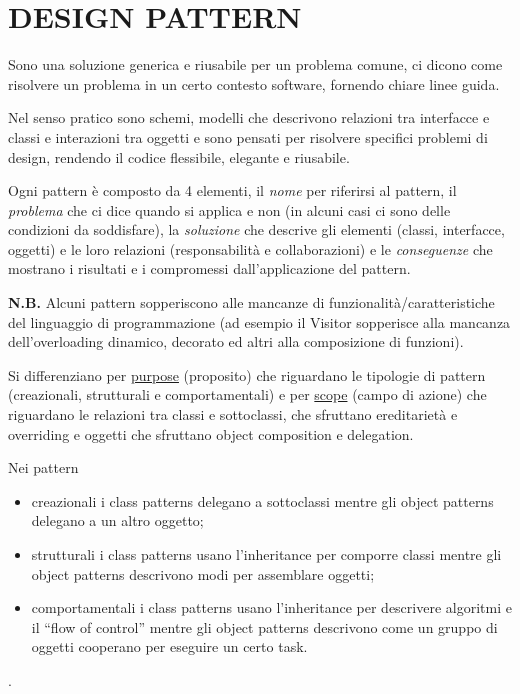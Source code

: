 \chapter{DESIGN PATTERN}

Sono una soluzione generica e riusabile per un problema comune, ci dicono come risolvere un problema in un certo contesto software, fornendo chiare linee guida.

Nel senso pratico sono schemi, modelli che descrivono relazioni tra interfacce e classi e interazioni tra oggetti e sono pensati per risolvere specifici problemi di design, 
rendendo il codice flessibile, elegante e riusabile. 

Ogni pattern è composto da 4 elementi, il \textit{nome} per riferirsi al pattern, il \textit{problema} che ci dice quando si applica e non 
(in alcuni casi ci sono delle condizioni da soddisfare), la \textit{soluzione} che descrive gli elementi (classi, interfacce, oggetti) e le loro relazioni 
(responsabilità e collaborazioni) e le \textit{conseguenze} che mostrano i risultati e i compromessi dall’applicazione del pattern.
\medskip

\textbf{N.B.} Alcuni pattern sopperiscono alle mancanze di funzionalità/caratteristiche del linguaggio di programmazione 
(ad esempio il Visitor sopperisce alla mancanza dell'overloading dinamico, decorato ed altri alla composizione di funzioni).
\medskip

Si differenziano per \underline{purpose} (proposito) che riguardano le tipologie di pattern (creazionali, strutturali e comportamentali) e per \underline{scope} 
(campo di azione) che riguardano le relazioni tra classi e sottoclassi, che sfruttano ereditarietà e overriding e oggetti che sfruttano object composition e delegation.
\smallskip

Nei pattern
\begin{itemize}
    \item creazionali i class patterns delegano a sottoclassi mentre gli object patterns delegano a un altro oggetto;
    \item strutturali i class patterns usano l’inheritance per comporre classi mentre gli object patterns descrivono modi per assemblare oggetti;
    \item comportamentali i class patterns usano l’inheritance per descrivere algoritmi e il “flow of control” mentre gli object patterns descrivono come un gruppo
    di oggetti cooperano per eseguire un certo task.
\end{itemize}.

